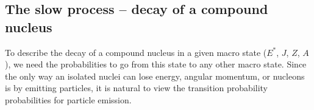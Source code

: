 \subsection{The slow process -- decay of a compound nucleus}
To describe the decay of a compound nucleus in a given macro state ($E^*$, $J$, $Z$, $A$), we need the probabilities to go from this state to any other macro state. Since the only way an isolated nuclei can lose energy, angular momentum, or nucleons is by emitting particles, it is natural to view the transition probability probabilities for particle emission.

